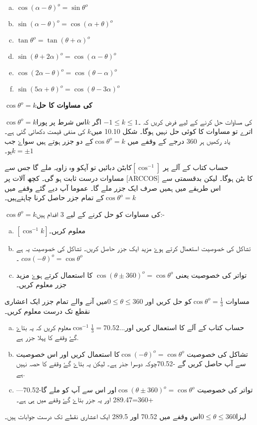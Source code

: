 \begin{multicols}{2}
\begin{enumerate}[a.]
\item \(\cos (\alpha -\theta)^o =\sin \theta^o\)
\item \(\sin (\alpha -\theta)^o =\cos (\alpha+\theta)^o\)
\item \(\tan \theta^o =\tan (\theta + \alpha)^o\)
\item \(\sin (\theta +2 \alpha)^o =\cos (\alpha -\theta)^o\)
\item \(\cos (2\alpha -\theta)^o =\cos (\theta -\alpha)^o\)
\item \(\sin (5\alpha +\theta)^o =\cos ( \theta -3\alpha)^o\)
\end{enumerate}
\end{multicols}
\textbf{\(\cos \theta^o = k\)کی مساوات کا حل}


\(\cos \theta^o = k\)کی مساوات حل کرنے کے لیے فرض کریں کہ ۔\(-1 \leq k \leq 1\)
 اگر \(k\)اس شرط پر پورا اترے تو مساوات کا کوئی حل نہیں ہوگا۔ شکل 10.10 میں\(k\) کی منفی قیمت دکھائی گئی ہے۔ یاد رکھیں ہر 360 درجے کے وقفے میں \(\cos \theta^o = k\)کے دو جزر ہوتے ہیں سواۓ جب \(k= \pm 1\)ہو۔

حساب کتاب کے آلے پر \([\cos^{-1}]\)کابٹن دبائیں تو آپکو وہ زاویہ ملے گا جس سے مساوات درست ثابت ہو گی۔ کچھ آلات پر [ARCCOS] کا بٹن ہوگا۔ لیکن بدقسمتی سے اس طریقے میں ہمیں صرف ایک جزر ملے گا۔ عموما آپ  دیے گئے وقفے میں  \(\cos \theta^o = k\)کے تمام جزر حاصل کرنا چاہتےہیں۔

 \(\cos \theta^o = k\)کی مساوات کو حل کرنے کے لیے 3 افدام ہیں:-

\begin{enumerate}[a.]
\item
\([\cos^{-1}k]\)معلوم کریں۔
\item
 تشاکل کی خصوصیت استعمال کرتے ہوۓ مزید ایک جزر حاصل کریں۔ تشاکل کی خصوصیت یہ ہے \(cos (-\theta)^o=\cos \theta^o\) ۔

\item
 تواتر کی خصوصیت یعنی \(\cos (\theta \pm 360)^o = \cos \theta^o\) کا استعمال کرتے ہوۓ مزید جزر معلوم کریں۔
\end{enumerate}

مساوات \(\cos \theta^o =\frac{1}{3}\)کو حل کریں اور \(0 \leq \theta \leq 360\)میں آنے والے تمام جزر ایک اعشاری نقطع تک درست معلوم کریں۔


\begin{enumerate}[a.]
\item
حساب کتاب کے آلے کا استعمال کریں اور\(\cos^{-1} \frac{1}{3}= 70.52...\)معلوم کریں کہ یہ بتاۓ گۓ وقفے کا پہلا جزر ہے.
\item
تشاکل کی خصوصیت \(\cos (-\theta)^o=\cos \theta^o\)کا استعمال کریں اور اس خصوصیت سے آپ حاصل کریں گے -70.52چوکہ دوسرا جذر ہے۔ لیکن یہ بتاۓ گۓ وقفے کا حصہ نہیں ہے.
\item
تواتر کی خصوصیت \(\cos (\theta \pm 360)^o = \cos \theta^o\)اور اس سے آپ کو ملے گا-70.52---+360=289.47 اور یہ جزر بتاۓ گۓ وقفے میں ہی ہے۔
\end{enumerate}
لہزا\(0 \leq \theta \leq 360\)اس وقفے میں 70.52 اور 289.5 ایک اعشاری نقطے تک درست جوابات ہیں۔ 

